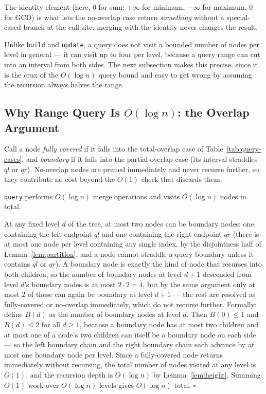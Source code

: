 \documentclass[
  11pt,
  a4paper,
  twoside=false,
  numbers=noenddot,
  headings=big,
  parskip=half,
  toc=bibliography,
  toc=listof,
  bibliography=totoc
]{scrreprt}
\newenvironment{proof}[1][Proof]{\par\noindent{\bfseries\sffamily\color{navy}#1.}\enspace}{\hfill$\square$\par\medskip}
\newcommand{\Oh}[1]{O\!\left(#1\right)}
\begin{document}
\begin{keyidea}
The identity element (here, $0$ for sum; $+\infty$ for minimum, $-\infty$ for maximum, $0$ for GCD) is what lets the no-overlap case return \emph{something} without a special-cased branch at the call site: merging with the identity never changes the result.
\end{keyidea}

Unlike \texttt{build} and \texttt{update}, a query does not visit a bounded number of nodes per level in general --- it can visit up to four per level, because a query range can cut into an interval from both sides. The next subsection makes this precise, since it is the crux of the $\Oh{\log n}$ query bound and easy to get wrong by assuming the recursion always halves the range.

\subsection{Why Range Query Is \texorpdfstring{$O(\log n)$}{O(log n)}: the Overlap Argument}
\label{sec:overlap-argument}
Call a node \emph{fully covered} if it falls into the total-overlap case of Table~\ref{tab:query-cases}, and \emph{boundary} if it falls into the partial-overlap case (its interval straddles $ql$ or $qr$). No-overlap nodes are pruned immediately and never recurse further, so they contribute no cost beyond the $O(1)$ check that discards them.

\begin{thm}\label{thm:query-time}
\texttt{query} performs $\Oh{\log n}$ merge operations and visits $\Oh{\log n}$ nodes in total.
\end{thm}
\begin{proof}
At any fixed level $d$ of the tree, at most two nodes can be boundary nodes: one containing the left endpoint $ql$ and one containing the right endpoint $qr$ (there is at most one node per level containing any single index, by the disjointness half of Lemma~\ref{lem:partition}, and a node cannot straddle a query boundary unless it contains $ql$ or $qr$). A boundary node is exactly the kind of node that recurses into both children, so the number of boundary nodes at level $d+1$ descended from level $d$'s boundary nodes is at most $2\cdot 2 = 4$, but by the same argument only at most $2$ of those can again be boundary at level $d+1$ --- the rest are resolved as fully-covered or no-overlap immediately, which do not recurse further. Formally: define $B(d)$ as the number of boundary nodes at level $d$. Then $B(0)\le 1$ and $B(d)\le 2$ for all $d\ge 1$, because a boundary node has at most two children and at most one of a node's two children can itself be a boundary node on each side --- so the left boundary chain and the right boundary chain each advance by at most one boundary node per level. Since a fully-covered node returns immediately without recursing, the total number of nodes visited at any level is $\Oh{1}$, and the recursion depth is $\Oh{\log n}$ by Lemma~\ref{lem:height}. Summing $\Oh{1}$ work over $\Oh{\log n}$ levels gives $\Oh{\log n}$ total.
\end{proof}
\end{document}
